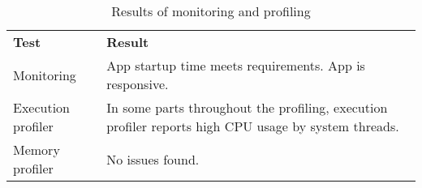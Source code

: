 
\begin{table}[htbp]
  \centering
  \caption{Results of monitoring and profiling}
  \label{tab:tests}
 \renewcommand{\arraystretch}{1.2}
    \begin{tabularx}{\textwidth}{p{3cm}|X}
    \rowcolor{mygray}
    \textbf{Test} & \textbf{Result} \\
       Monitoring & App startup time meets requirements. App is responsive. \\ \hline
       Execution profiler & In some parts throughout the profiling, execution profiler reports high CPU usage by system threads.\footnotemark \\ \hline
       Memory profiler & No issues found. \\       
    \end{tabularx}%
\end{table}%
